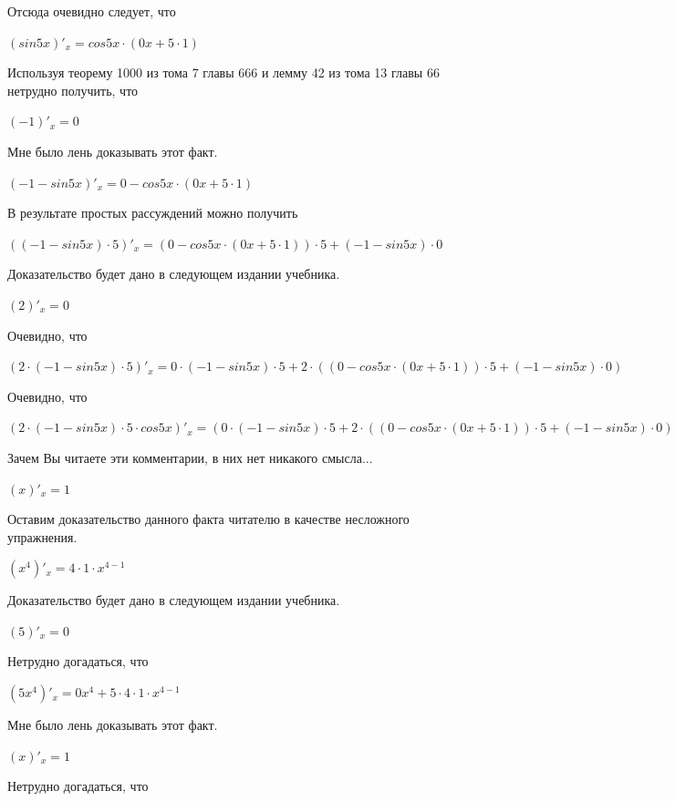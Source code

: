 \documentclass[12pt,a4paper,fleqn]{article}
\theoremstyle{definition}
\begin{document}
Отсюда очевидно следует, что 

$(sin 5  x )'_{x} = cos 5  x  \cdot ( 0  x  +  5  \cdot  1 )$

Используя теорему 1000 из тома 7 главы 666 и лемму 42 из тома 13 главы 66 нетрудно получить, что 

$( -1 )'_{x} =  0 $

Мне было лень доказывать этот факт.

$( -1  - sin 5  x )'_{x} =  0  - cos 5  x  \cdot ( 0  x  +  5  \cdot  1 )$

В результате простых рассуждений можно получить 

$(( -1  - sin 5  x ) \cdot  5 )'_{x} = ( 0  - cos 5  x  \cdot ( 0  x  +  5  \cdot  1 )) \cdot  5  + ( -1  - sin 5  x ) \cdot  0 $

Доказательство будет дано в следующем издании учебника. 

$( 2 )'_{x} =  0 $

Очевидно, что 

$( 2  \cdot ( -1  - sin 5  x ) \cdot  5 )'_{x} =  0  \cdot ( -1  - sin 5  x ) \cdot  5  +  2  \cdot (( 0  - cos 5  x  \cdot ( 0  x  +  5  \cdot  1 )) \cdot  5  + ( -1  - sin 5  x ) \cdot  0 )$

Очевидно, что 

$( 2  \cdot ( -1  - sin 5  x ) \cdot  5  \cdot cos 5  x )'_{x} = ( 0  \cdot ( -1  - sin 5  x ) \cdot  5  +  2  \cdot (( 0  - cos 5  x  \cdot ( 0  x  +  5  \cdot  1 )) \cdot  5  + ( -1  - sin 5  x ) \cdot  0 )) \cdot cos 5  x  +  2  \cdot ( -1  - sin 5  x ) \cdot  5  \cdot ( -1  - sin 5  x ) \cdot ( 0  x  +  5  \cdot  1 )$

Зачем Вы читаете эти комментарии, в них нет никакого смысла... 

$( x )'_{x} =  1 $

Оставим доказательство данного факта читателю в качестве несложного упражнения. 

$({ x }^{ 4 })'_{x} =  4  \cdot  1  \cdot { x }^{ 4  -  1 }$

Доказательство будет дано в следующем издании учебника. 

$( 5 )'_{x} =  0 $

Нетрудно догадаться, что 

$( 5 { x }^{ 4 })'_{x} =  0 { x }^{ 4 } +  5  \cdot  4  \cdot  1  \cdot { x }^{ 4  -  1 }$

Мне было лень доказывать этот факт.

$( x )'_{x} =  1 $

Нетрудно догадаться, что 
\end{document}
